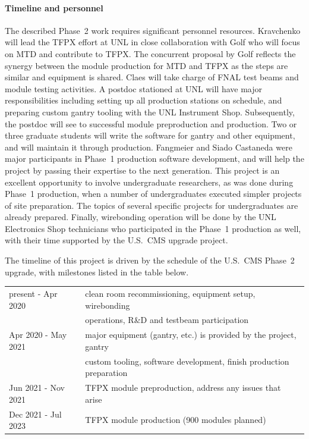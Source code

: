 \paragraph{Timeline and personnel}

The described Phase~2 work requires significant personnel resources. Kravchenko will lead the TFPX effort at UNL in close collaboration with Golf who will focus on MTD and contribute to TFPX. The concurrent proposal by Golf reflects the synergy between the module production for MTD and TFPX as the steps are similar and equipment is shared. Claes will take charge of FNAL test beams and module testing activities. A postdoc stationed at UNL will have major responsibilities including setting up all production stations on schedule, and preparing custom gantry tooling with the UNL Instrument Shop.
Subsequently, the postdoc will see to successful module preproduction and production. Two or three graduate students will write the software for gantry and other equipment, and will maintain it through production. Fangmeier and Siado Castaneda were major participants in  Phase~1 production software development, and will help the project by passing their expertise to the next generation. This project is an excellent opportunity to involve undergraduate researchers, as was done during Phase~1 production, when a number of undergraduates executed simpler projects of site preparation. The topics of several specific projects for undergraduates are already prepared.
Finally,  wirebonding operation will be done by the UNL Electronics Shop technicians who participated in the Phase~1 production as well, with their time supported by the U.S.~CMS upgrade project.

The timeline of this project is driven by the schedule of the U.S.~CMS Phase~2 upgrade, with milestones listed in the table below.

\vspace{3mm}
\noindent
\begin{tabular}{l|l}
\hline
present - Apr 2020 & clean room recommissioning, equipment setup, wirebonding \\
        &  operations, R\&D and testbeam participation \\
Apr 2020 - May 2021 
         & major equipment (gantry, etc.) is provided by the project, gantry \\
         & custom tooling, software development, finish production preparation \\
Jun 2021 - Nov 2021
         & TFPX module preproduction, address any issues that arise \\
Dec 2021 - Jul 2023 
         &  TFPX module production (900 modules planned) \\
\hline
\end{tabular}


